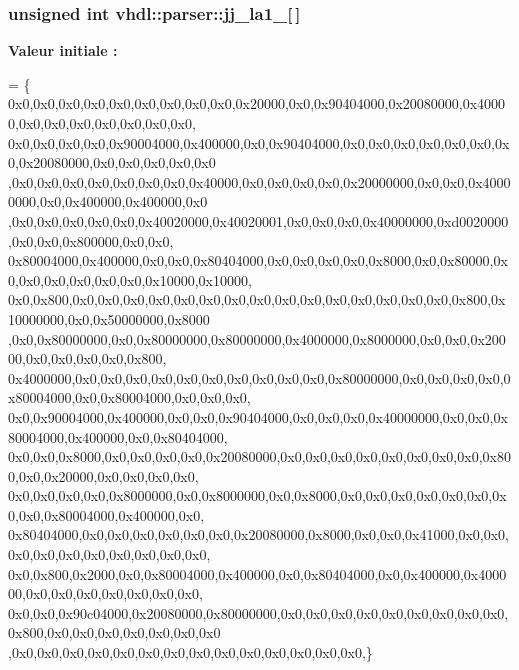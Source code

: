 \subsubsection[{jj\+\_\+la1\+\_\+0}]{\setlength{\rightskip}{0pt plus 5cm}unsigned int vhdl\+::parser\+::jj\+\_\+la1\+\_\mbox{[}$\,$\mbox{]}}\label{namespacevhdl_1_1parser_a48bdc5c58eb15649c61b2d623bcbdc29}
{\bfseries Valeur initiale \+:}
\begin{DoxyCode}
= \{
0x0,0x0,0x0,0x0,0x0,0x0,0x0,0x0,0x0,0x20000,0x0,0x90404000,0x20080000,0x40000,0x0,0x0,0x0,0x0,0x0,0x0,0x0,
      0x0,0x0,0x0,0x0,0x90004000,0x400000,0x0,0x90404000,0x0,0x0,0x0,0x0,0x0,0x0,0x0,0x20080000,0x0,0x0,0x0,0x0,0x0
      ,0x0,0x0,0x0,0x0,0x0,0x0,0x0,0x40000,0x0,0x0,0x0,0x0,0x20000000,0x0,0x0,0x40000000,0x0,0x400000,0x400000,0x0
      ,0x0,0x0,0x0,0x0,0x0,0x40020000,0x40020001,0x0,0x0,0x0,0x40000000,0xd0020000,0x0,0x0,0x800000,0x0,0x0,
      0x80004000,0x400000,0x0,0x0,0x80404000,0x0,0x0,0x0,0x0,0x8000,0x0,0x80000,0x0,0x0,0x0,0x0,0x0,0x0,0x10000,0x10000,
      0x0,0x800,0x0,0x0,0x0,0x0,0x0,0x0,0x0,0x0,0x0,0x0,0x0,0x0,0x0,0x0,0x0,0x800,0x10000000,0x0,0x50000000,0x8000
      ,0x0,0x80000000,0x0,0x80000000,0x80000000,0x4000000,0x8000000,0x0,0x0,0x20000,0x0,0x0,0x0,0x0,0x800,
      0x4000000,0x0,0x0,0x0,0x0,0x0,0x0,0x0,0x0,0x0,0x0,0x80000000,0x0,0x0,0x0,0x0,0x80004000,0x0,0x80004000,0x0,0x0,0x0,
      0x0,0x90004000,0x400000,0x0,0x0,0x90404000,0x0,0x0,0x0,0x40000000,0x0,0x0,0x80004000,0x400000,0x0,0x80404000,
      0x0,0x0,0x8000,0x0,0x0,0x0,0x0,0x20080000,0x0,0x0,0x0,0x0,0x0,0x0,0x0,0x0,0x800,0x0,0x20000,0x0,0x0,0x0,0x0,
      0x0,0x0,0x0,0x0,0x8000000,0x0,0x8000000,0x0,0x8000,0x0,0x0,0x0,0x0,0x0,0x0,0x0,0x0,0x80004000,0x400000,0x0,
      0x80404000,0x0,0x0,0x0,0x0,0x0,0x0,0x20080000,0x8000,0x0,0x0,0x41000,0x0,0x0,0x0,0x0,0x0,0x0,0x0,0x0,0x0,0x0,
      0x0,0x800,0x2000,0x0,0x80004000,0x400000,0x0,0x80404000,0x0,0x400000,0x400000,0x0,0x0,0x0,0x0,0x0,0x0,0x0,
      0x0,0x0,0x90c04000,0x20080000,0x80000000,0x0,0x0,0x0,0x0,0x0,0x0,0x0,0x0,0x0,0x800,0x0,0x0,0x0,0x0,0x0,0x0,0x0
      ,0x0,0x0,0x0,0x0,0x0,0x0,0x0,0x0,0x0,0x0,0x0,0x0,0x0,0x0,\}
\end{DoxyCode}
\hypertarget{namespacevhdl_1_1parser_a49f05db6f0680c2723cb125a109a48fa}{}
